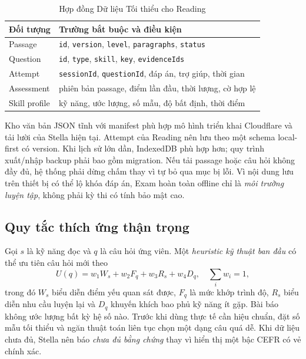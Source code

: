 \documentclass[conference,10pt]{IEEEtran}
\begin{document}
\begin{table}[t]
\caption{Hợp đồng Dữ liệu Tối thiểu cho Reading}
\label{tab:contract}
\centering\footnotesize
\begin{tabularx}{\columnwidth}{@{}p{}X@{}}
\toprule
Đối tượng & Trường bắt buộc và điều kiện\\
\midrule
Passage & \texttt{id}, \texttt{version}, \texttt{level}, \texttt{paragraphs}, \texttt{status}\\
Question & \texttt{id}, \texttt{type}, \texttt{skill}, \texttt{key}, \texttt{evidenceIds}\\
Attempt & \texttt{sessionId}, \texttt{questionId}, đáp án, trợ giúp, thời gian\\
Assessment & phiên bản passage, điểm lần đầu, thời lượng, cờ hợp lệ\\
Skill profile & kỹ năng, ước lượng, số mẫu, độ bất định, thời điểm\\
\bottomrule
\end{tabularx}
\end{table}

Kho văn bản JSON tĩnh với manifest phù hợp mô hình triển khai Cloudflare và tải lười của Stella hiện tại. Attempt của Reading nên lưu theo một schema local-first có version. Khi lịch sử lớn dần, IndexedDB phù hợp hơn; quy trình xuất/nhập backup phải bao gồm migration. Nếu tải passage hoặc câu hỏi không đầy đủ, hệ thống phải dừng chấm thay vì tự bỏ qua mục bị lỗi. Vì nội dung lưu trên thiết bị có thể lộ khóa đáp án, Exam hoàn toàn offline chỉ là \emph{môi trường luyện tập}, không phải kỳ thi có tính bảo mật cao.

\subsection{Quy tắc thích ứng thận trọng}
Gọi $s$ là kỹ năng đọc và $q$ là câu hỏi ứng viên. Một \emph{heuristic kỹ thuật ban đầu} có thể ưu tiên câu hỏi mới theo
\begin{equation}
U(q)=w_1W_s+w_2F_q+w_3R_s+w_4D_q,\quad \sum_iw_i=1,
\label{eq:selection}
\end{equation}
trong đó $W_s$ biểu diễn điểm yếu quan sát được, $F_q$ là mức khớp trình độ, $R_s$ biểu diễn nhu cầu luyện lại và $D_q$ khuyến khích bao phủ kỹ năng ít gặp. Bài báo không ước lượng bất kỳ hệ số nào. Trước khi dùng thực tế cần hiệu chuẩn, đặt số mẫu tối thiểu và ngăn thuật toán liên tục chọn một dạng câu quá dễ. Khi dữ liệu chưa đủ, Stella nên báo \emph{chưa đủ bằng chứng} thay vì hiển thị một bậc CEFR có vẻ chính xác.
\end{document}
